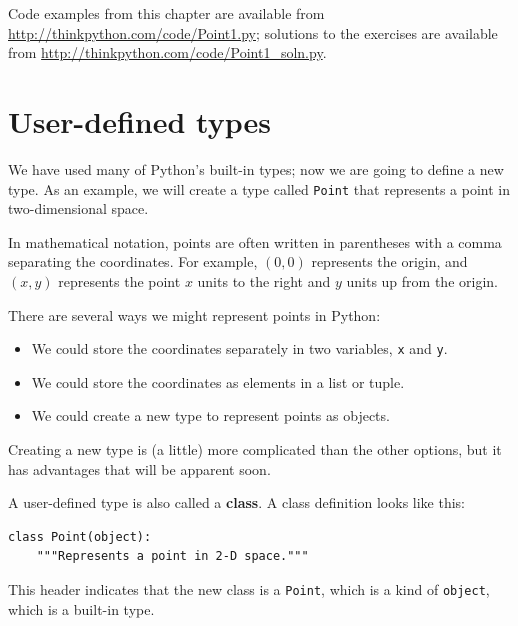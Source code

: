\documentclass[10pt]{book}
\begin{document}
\begin{CJK}{UTF8}{gbsn}
Code examples from this chapter are available from
\url{http://thinkpython.com/code/Point1.py}; solutions
to the exercises are available from
\url{http://thinkpython.com/code/Point1_soln.py}.


\section{User-defined types}
\label{point}

We have used many of Python's built-in types; now we are going
to define a new type.  As an example, we will create a type
called {\tt Point} that represents a point in two-dimensional
space.

In mathematical notation, points are often written in
parentheses with a comma separating the coordinates. For example,
$(0,0)$ represents the origin, and $(x,y)$ represents the
point $x$ units to the right and $y$ units up from the origin.

There are several ways we might represent points in Python:

\begin{itemize}

\item We could store the coordinates separately in two
variables, {\tt x} and {\tt y}.

\item We could store the coordinates as elements in a list
or tuple.

\item We could create a new type to represent points as
objects.

\end{itemize}

Creating a new type
is (a little) more complicated than the other options, but
it has advantages that will be apparent soon.

A user-defined type is also called a {\bf class}.
A class definition looks like this:

\begin{verbatim}
class Point(object):
    """Represents a point in 2-D space."""
\end{verbatim}
%
This header indicates that the new class is a {\tt Point},
which is a kind of {\tt object}, which is a built-in
type.


\end{CJK}
\end{document}
